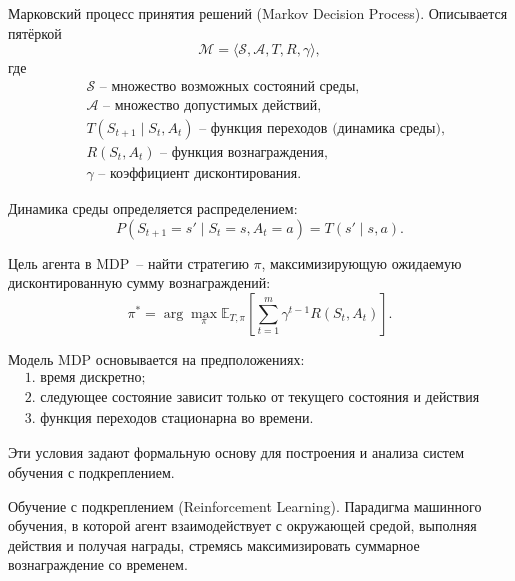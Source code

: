 \begin{definition}
    \label{def:mdp}
    Марковский процесс принятия решений (Markov Decision Process). Описывается пятёркой
    \begin{equation}
    \mathcal{M} = \langle \mathcal{S}, \mathcal{A}, T, R, \gamma \rangle,
    \end{equation}
    где
    \begin{equation}
        \begin{aligned}
        & \mathcal{S}\text{~-- множество возможных состояний среды,}\\
        &\mathcal{A} \text{~-- множество допустимых действий,}\\
        &T(S_{t+1} \mid S_t, A_t) \text{~-- функция переходов (динамика среды),}\\
        &R(S_t, A_t) \text{~-- функция вознаграждения,}\\
        &\gamma \text{~-- коэффициент дисконтирования.}
        \end{aligned}
    \end{equation}
\end{definition}


Динамика среды определяется распределением:
\begin{equation}
P(S_{t+1} = s' \mid S_t = s, A_t = a) = T(s' \mid s, a).
\end{equation}

Цель агента в MDP~-- найти стратегию $\pi$, максимизирующую ожидаемую дисконтированную сумму вознаграждений:
\begin{equation}
\pi^* = \arg\max_{\pi} \mathbb{E}_{T,\pi}\!\left[\sum_{t=1}^{m} \gamma^{t-1} R(S_t, A_t)\right].
\end{equation}

Модель MDP основывается на предположениях:
\begin{equation}
\begin{aligned}
&\text{1. время дискретно;} \\
&\text{2. следующее состояние зависит только от текущего состояния и действия (свойство Маркова);} \\
&\text{3. функция переходов стационарна во времени.}
\end{aligned}
\end{equation}

Эти условия задают формальную основу для построения и анализа систем обучения с подкреплением.


\begin{definition}
    \label{def:rl}
    Обучение с подкреплением (Reinforcement Learning). Парадигма машинного обучения, в которой агент взаимодействует с окружающей средой, выполняя действия и получая награды, стремясь максимизировать суммарное вознаграждение со временем.
\end{definition}

